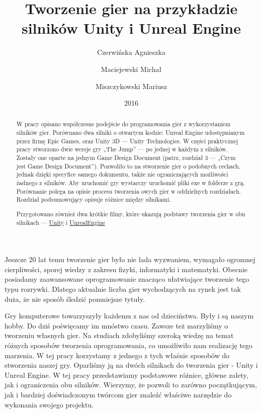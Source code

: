 \documentclass[12pt]{xmgr}
\author   {Czerwińska Agnieszka}
\author   {Maciejewski Michał}
\author   {Miszczykowski Mariusz}
\title    {Tworzenie gier na przykładzie silników Unity i Unreal Engine}
\date     {2016}
\begin{document}
\begin{abstract}
W pracy opisano współczesne podejście do programowania gier z wykorzystaniem silników gier. Porównano dwa silniki o otwartym kodzie: Unreal Engine udostępnianym przez firmę Epic Games, oraz Unity 3D — Unity Technologies. W części praktycznej pracy stworzono dwie wersje gry
„The Jump” — po jednej w każdym z silników. Zostały one oparte na jednym Game Design Document (patrz, rozdział 3 — „Czym jest Game Design Document”). Pozwoliło to na stworzenie gier o podobnych cechach, jednak dzięki specyfice samego dokumentu, także nie ograniczających możliwości żadnego z silników. Aby uruchomić gry wystarczy uruchomić pliki exe w folderze z grą. Porównanie polega na opisie procesu tworzenia owych gier w oddzielnych rozdziałach. Rozdział podsumowujący opisuje różnice między silnikami.

Przygotowano również dwa krótkie filmy, które ukazują podstawy tworzenia gier w obu silnikach — \href{https://www.youtube.com/watch?v=phQOiSH_uXU}{Unity} i \href{https://www.youtube.com/watch?v=V53ZVRSyOgc}{UnrealEngine}
\end{abstract}


\maketitle

\introduction

Jeszcze 20 lat temu tworzenie gier było nie lada wyzwaniem, wymagało ogromnej cierpliwości, sporej wiedzy z zakresu fizyki, informatyki i matematyki. Obecnie posiadamy zaawansowane oprogramowanie znacząco ułatwiające tworzenie tego typu rozrywki. Dlatego aktualnie liczba gier wychodzących na rynek jest tak duża, że nie sposób śledzić pomniejsze tytuły.

Gry komputerowe towarzyszyły każdemu z nas od dzieciństwa. Były i są naszym hobby. Do dziś poświęcamy im mnóstwo czasu. Zawsze też marzyliśmy o tworzeniu własnych gier. Na studiach zdobyliśmy szeroką wiedzę na temat różnych sposobów tworzenia oprogramowania, co umożliwiło nam realizację tego marzenia. W tej pracy korzystamy z jednego z tych właśnie sposobów do stworzenia naszej gry. Oparliśmy ją na dwóch silnikach do tworzenia gier - Unity i Unreal Engine. W tej pracy przedstawiamy podstawowe różnice, główne zalety, jak i ograniczenia obu silników. Wierzymy, że pozwoli to zarówno początkującym, jak i bardziej doświadczonym twórcom gier znaleźć właściwe narzędzie do wykonania swojego projektu.
\end{document}
